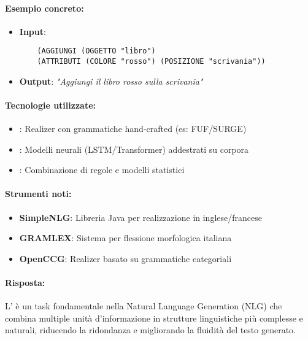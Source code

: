 \paragraph{Esempio concreto:}
\begin{itemize}
  \item \textbf{Input}: 
  \begin{verbatim}
    (AGGIUNGI (OGGETTO "libro") 
    (ATTRIBUTI (COLORE "rosso") (POSIZIONE "scrivania"))
  \end{verbatim}
  \item \textbf{Output}: \textit{"Aggiungi il libro rosso sulla scrivania"}
\end{itemize}

\paragraph{Tecnologie utilizzate:}
\begin{itemize}
  \item {}: Realizer con grammatiche hand-crafted (es: FUF/SURGE)
  \item {}: Modelli neurali (LSTM/Transformer) addestrati su corpora
  \item {}: Combinazione di regole e modelli statistici
\end{itemize}

\paragraph{Strumenti noti:}
\begin{itemize}
  \item \textbf{SimpleNLG}: Libreria Java per realizzazione in inglese/francese
  \item \textbf{GRAMLEX}: Sistema per flessione morfologica italiana
  \item \textbf{OpenCCG}: Realizer basato su grammatiche categoriali
\end{itemize}


\paragraph{Risposta:} L' è un task fondamentale nella Natural Language Generation (NLG) che combina multiple unità d'informazione in strutture linguistiche più complesse e naturali, riducendo la ridondanza e migliorando la fluidità del testo generato.

